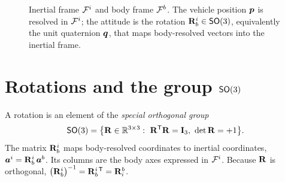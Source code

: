 \begin{figure}[t]
\centering
{}
\caption{Inertial frame $\mathcal{F}^{i}$ and body frame $\mathcal{F}^{b}$. The vehicle
position $\bm{p}$ is resolved in $\mathcal{F}^{i}$; the attitude is the rotation
$\mathbf{R}_b^i\in\mathsf{SO}(3)$, equivalently the unit quaternion $\bm{q}$, that maps
body-resolved vectors into the inertial frame.}
\label{fig:frames}
\end{figure}

\section{Rotations and the group \texorpdfstring{$\mathsf{SO}(3)$}{SO(3)}}

A rotation is an element of the \emph{special orthogonal group}
\begin{equation}
\SO(3)=\bigl\{\mat{R}\in\R^{3\times3}:\ \mat{R}\T\mat{R}=\mat{I}_3,\ \det\mat{R}=+1\bigr\}.
\end{equation}
The matrix $\mathbf{R}_b^i$ maps body-resolved coordinates to inertial coordinates,
$\bm{a}^{i}=\mathbf{R}_b^i\,\bm{a}^{b}$. Its columns are the body axes expressed in
$\mathcal{F}^{i}$. Because $\mathbf{R}$ is orthogonal, $\bigl(\mathbf{R}_b^i\bigr)^{-1}
=\mathbf{R}_b^{i\,\mathsf T}=\mathbf{R}_i^b$.

